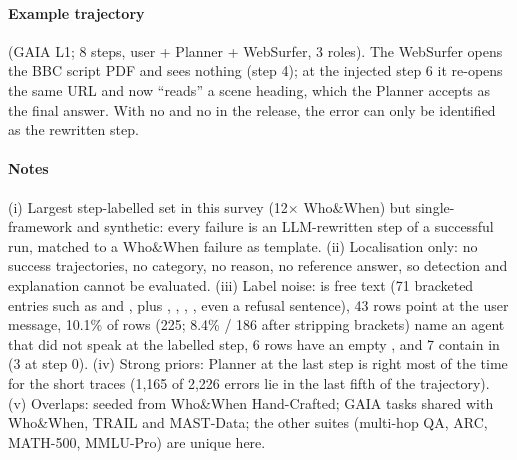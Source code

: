 \paragraph{Example trajectory}  (GAIA L1; 8 steps, user + Planner + WebSurfer, 3 roles). The WebSurfer opens the BBC script PDF and sees nothing (step 4); at the injected step 6 it re-opens the same URL and now ``reads'' a scene heading, which the Planner accepts as the final answer. With no  and no  in the release, the error can only be identified as the rewritten step.


\paragraph{Notes} (i) Largest step-labelled set in this survey (12$\times$ Who\&When) but single-framework and synthetic: every failure is an LLM-rewritten step of a successful run, matched to a Who\&When failure as template. (ii) Localisation only: no success trajectories, no category, no reason, no reference answer, so detection and explanation cannot be evaluated. (iii) Label noise:  is free text (71 bracketed entries such as \code{[Planner]} and \code{[WebSurfer]}, plus , , , , even a refusal sentence), 43 rows point at the user message, 10.1\% of rows (225; 8.4\% / 186 after stripping brackets) name an agent that did not speak at the labelled step, 6 rows have an empty , and 7 contain  in  (3 at step 0). (iv) Strong priors: Planner at the last step is right most of the time for the short traces (1,165 of 2,226 errors lie in the last fifth of the trajectory). (v) Overlaps: seeded from Who\&When Hand-Crafted; GAIA tasks shared with Who\&When, TRAIL and MAST-Data; the other suites (multi-hop QA, ARC, MATH-500, MMLU-Pro) are unique here.
